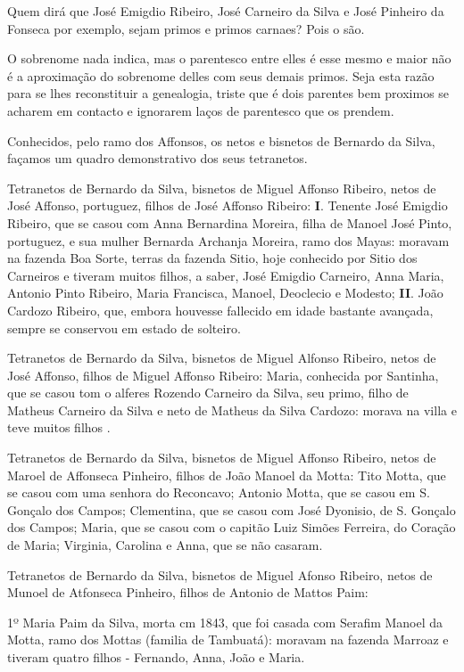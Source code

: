 Quem dirá que José Emigdio Ribeiro, José Carneiro da Silva e José Pinheiro da Fonseca por exemplo, sejam primos e primos carnaes? Pois o são.

O sobrenome nada indica, mas o parentesco entre elles é esse mesmo e maior não é a aproximação do sobrenome delles com seus demais primos. Seja esta razão para se lhes reconstituir a genealogia, triste que é dois parentes bem proximos se acharem em contacto e ignorarem  laços de parentesco que os prendem.

Conhecidos, pelo ramo dos Affonsos, os netos e bisnetos de Bernardo da Silva, façamos um quadro demonstrativo dos seus tetranetos.

Tetranetos de Bernardo da Silva, bisnetos de Miguel Affonso Ribeiro, netos de José Affonso, portuguez, filhos de José Affonso Ribeiro:
\textbf{I}. Tenente José Emigdio Ribeiro, que se casou com Anna Bernardina Moreira, filha de Manoel José Pinto, portuguez, e sua mulher Bernarda Archanja Moreira, ramo dos Mayas: moravam na fazenda Boa Sorte, terras da fazenda Sitio, hoje conhecido por Sitio dos Carneiros e tiveram muitos filhos, a saber, José Emigdio Carneiro, Anna Maria, Antonio Pinto Ribeiro, Maria Francisca, Manoel, Deoclecio e Modesto; \textbf{II}. João Cardozo Ribeiro, que, embora houvesse fallecido em idade bastante avançada, sempre se conservou em estado de solteiro.

Tetranetos de Bernardo da Silva, bisnetos de Miguel Alfonso Ribeiro, netos de José Affonso, filhos de Miguel Affonso Ribeiro: Maria, conhecida por Santinha, que se casou tom o alferes Rozendo Carneiro da Silva, seu primo, filho de Matheus Carneiro da Silva e neto de Matheus da Silva Cardozo: morava na villa e teve muitos filhos .

Tetranetos de Bernardo da Silva, bisnetos de Miguel Affonso Ribeiro, netos de Maroel de Affonseca Pinheiro, filhos de João Manoel da Motta: Tito Motta, que se casou com uma senhora do Reconcavo; Antonio Motta, que se casou em S.  Gonçalo dos Campos; Clementina, que se casou com José Dyonisio, de S. Gonçalo dos Campos; Maria, que se casou com o capitão Luiz Simões Ferreira, do Coração de Maria; Virginia, Carolina e Anna, que se não casaram.

Tetranetos de Bernardo da Silva, bisnetos de Miguel Afonso Ribeiro, netos de Munoel de Atfonseca Pinheiro, filhos de Antonio de Mattos Paim:

\hspace{2em}1º Maria Paim da Silva, morta cm 1843, que foi casada com Serafim Manoel da Motta, ramo dos Mottas (familia de Tambuatá): moravam na fazenda Marroaz e tiveram quatro filhos - Fernando, Anna, João e Maria.

